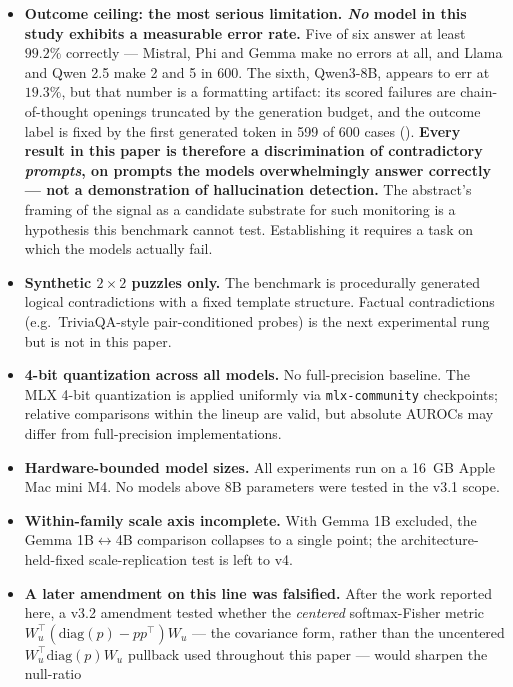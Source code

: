 \documentclass[10pt, letterpaper]{article}
\newcommand{\Wu}{W_u}
\begin{document}
\begin{itemize}[leftmargin=*, itemsep=2pt, topsep=2pt]
  \item \textbf{Outcome ceiling: the most serious limitation.
  \emph{No} model in this study exhibits a measurable error rate.}
  Five of six answer at least $99.2\%$ correctly --- Mistral, Phi and
  Gemma make no errors at all, and Llama and Qwen 2.5 make 2 and 5 in
  600. The sixth, Qwen3-8B, appears to err at $19.3\%$, but that number
  is a formatting artifact: its scored failures are chain-of-thought
  openings truncated by the generation budget, and the outcome label is
  fixed by the first generated token in 599 of 600 cases
  (). \textbf{Every result in this paper is
  therefore a discrimination of contradictory \emph{prompts}, on
  prompts the models overwhelmingly answer correctly --- not a
  demonstration of hallucination detection.} The abstract's framing of
  the signal as a candidate substrate for such monitoring is a
  hypothesis this benchmark cannot test. Establishing it requires a
  task on which the models actually fail.
  \item \textbf{Synthetic $2 \times 2$ puzzles only.} The benchmark is
  procedurally generated logical contradictions with a fixed template
  structure. Factual contradictions (e.g.\ TriviaQA-style
  pair-conditioned probes) is the next experimental rung but is not
  in this paper.
  \item \textbf{4-bit quantization across all models.} No
  full-precision baseline. The MLX 4-bit quantization is applied
  uniformly via \texttt{mlx-community} checkpoints; relative
  comparisons within the lineup are valid, but absolute AUROCs may
  differ from full-precision implementations.
  \item \textbf{Hardware-bounded model sizes.} All experiments run on
  a 16~GB Apple Mac mini M4. No models above 8B parameters were tested
  in the v3.1 scope.
  \item \textbf{Within-family scale axis incomplete.} With Gemma 1B
  excluded, the Gemma 1B$\leftrightarrow$4B comparison collapses to a
  single point; the architecture-held-fixed scale-replication test
  is left to v4.
  \item \textbf{A later amendment on this line was falsified.} After
  the work reported here, a v3.2 amendment tested whether the
  \emph{centered} softmax-Fisher metric
  $\Wu^{\top}(\mathrm{diag}(p) - pp^{\top})\Wu$ --- the covariance form,
  rather than the uncentered $\Wu^{\top}\mathrm{diag}(p)\Wu$ pullback
  used throughout this paper --- would sharpen the null-ratio

\end{itemize}
\end{document}
